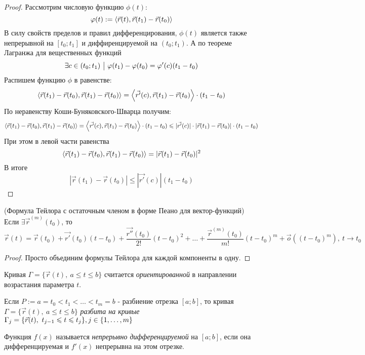 \begin{proof}
	Рассмотрим числовую функцию $\phi(t)$:
	\[
		\varphi(t) := \left\langle\vec{r}(t), \vec{r}(t_1) - \vec{r}(t_0)\right\rangle
	\]
	В силу свойств пределов и правил дифференцирования, $\phi(t)$ является также непрерывной на $[t_0; t_1]$ и диффиренцируемой на $(t_0; t_1)$. А по теореме Лагранжа для вещественных функций
	\[
		\exists c \in (t_0; t_1) \ \big|\  \varphi(t_1) - \varphi(t_0) = \varphi'(c)(t_1 - t_0)
	\]
	Распишем функцию $\phi$ в равенстве:
	\[
		\left\langle\vec{r}(t_1) - \vec{r}(t_0), \vec{r}(t_1) - \vec{r}(t_0)\right\rangle = \left\langle\vec{r'}(c), \vec{r}(t_1) - \vec{r}(t_0)\right\rangle \cdot (t_1 - t_0)
	\]
	По неравенству Коши-Буняковского-Шварца получим:
	\[
		\left\langle\vec{r}(t_1) - \vec{r}(t_0), \vec{r}(t_1) - \vec{r}(t_0)\right\rangle = \left\langle\vec{r'}(c), \vec{r}(t_1) - \vec{r}(t_0)\right\rangle \cdot (t_1 - t_0) \leqslant |\vec{r'}(c)| \cdot |\vec{r}(t_1) - \vec{r}(t_0)| \cdot (t_1 - t_0)
	\]
	При этом в левой части равенства
	\[
		\left\langle\vec{r}(t_1) - \vec{r}(t_0), \vec{r}(t_1) - \vec{r}(t_0)\right\rangle = |\vec{r}(t_1) - \vec{r}(t_0)|^2
	\]
	В итоге
	\[
		|\vec{r}(t_1) - \vec{r}(t_0)| \le |\vec{r'}(c)|(t_1 - t_0)
	\]
\end{proof}

\begin{theorem} (Формула Тейлора с остаточным членом в форме Пеано для вектор-функций)
	Если $\exists \vec{r}^{(m)}(t_0)$, то
	\[
		\vec{r}(t) = \vec{r}(t_0) + \vec{r'}(t_0)(t - t_0) + \frac{\vec{r''}(t_0)}{2!}(t - t_0)^2 + \ldots + \frac{\vec{r}^{(m)}(t_0)}{m!}(t - t_0)^m + \vec{o}\left((t - t_0)^m\right),\ t \to t_0
	\]
\end{theorem}

\begin{proof}
	Просто объединим формулы Тейлора для каждой компоненты в одну.
\end{proof}

\begin{definition}
	Кривая $\Gamma = \{\vec{r}(t),\ a \le t \le b\}$ считается \textit{ориентированной} в направлении возрастания параметра $t$.
\end{definition}

\begin{definition}
	Если $P := a = t_0 < t_1 < \ldots < t_m = b$ - разбиение отрезка $[a; b]$, то кривая $\Gamma = \{\vec{r}(t),\ a \le t \le b\}$ \textit{разбита на кривые} $\Gamma_j = \{\vec{r}(t),\ t_{j - 1} \leqslant t \leqslant t_j\}, j \in \{1, \ldots, m\}$
\end{definition}

\begin{definition}
	Функция $f(x)$ называется \textit{непрерывно дифференцируемой} на $[a; b]$, если она дифференцируемая и $f'(x)$ непрерывна на этом отрезке.
\end{definition}

